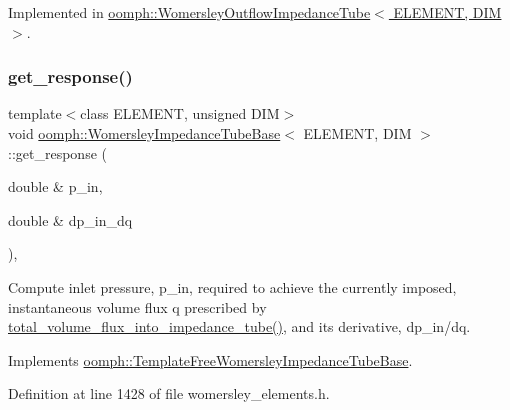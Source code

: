 Implemented in \hyperlink{classoomph_1_1WomersleyOutflowImpedanceTube_a31655c396b473246a6a9840d789dc046}{oomph\+::\+Womersley\+Outflow\+Impedance\+Tube$<$ E\+L\+E\+M\+E\+N\+T, D\+I\+M $>$}.

\mbox{\label{classoomph_1_1WomersleyImpedanceTubeBase_a62628115802f53da76c5e4f29de628c7}} 
\subsubsection{\texorpdfstring{get\+\_\+response()}{get\_response()}}
{\footnotesize\ttfamily template$<$class E\+L\+E\+M\+E\+NT, unsigned D\+IM$>$ \\
void \hyperlink{classoomph_1_1WomersleyImpedanceTubeBase}{oomph\+::\+Womersley\+Impedance\+Tube\+Base}$<$ E\+L\+E\+M\+E\+NT, D\+IM $>$\+::get\+\_\+response (\begin{DoxyParamCaption}\item[{double \&}]{p\+\_\+in,  }\item[{double \&}]{dp\+\_\+in\+\_\+dq }\end{DoxyParamCaption})\hspace{0.3cm}{\ttfamily [inline]}, {\ttfamily [virtual]}}



Compute inlet pressure, p\+\_\+in, required to achieve the currently imposed, instantaneous volume flux q prescribed by \hyperlink{classoomph_1_1WomersleyImpedanceTubeBase_aa321d54eb9f818975854f8f3cc568256}{total\+\_\+volume\+\_\+flux\+\_\+into\+\_\+impedance\+\_\+tube()}, and its derivative, dp\+\_\+in/dq. 



Implements \hyperlink{classoomph_1_1TemplateFreeWomersleyImpedanceTubeBase_a95c60d5f7661be3ee298cd2b4bd45de5}{oomph\+::\+Template\+Free\+Womersley\+Impedance\+Tube\+Base}.



Definition at line 1428 of file womersley\+\_\+elements.\+h.

\mbox{\label{classoomph_1_1WomersleyImpedanceTubeBase_abdb65e815a6b49ffb2b4ac180c968ccc}} 
